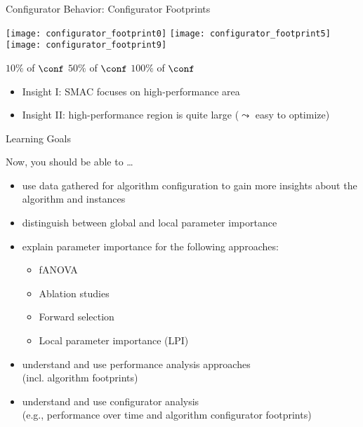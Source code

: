 \begin{frame}[c]{Configurator Behavior: Configurator Footprints}

\centering
\texttt{[image: configurator\_footprint0]}\quad
\texttt{[image: configurator\_footprint5]}\quad
\texttt{[image: configurator\_footprint9]}

$10\%$ of $\conf$ \hspace{2.1cm} $50\%$ of $\conf$ \hspace{2.1cm} $100\%$ of $\conf$

\bigskip
\pause

\begin{itemize}
  \item \alert{Insight I}: SMAC focuses on high-performance area
  \item \alert{Insight II}: high-performance region is quite large ($\leadsto$ easy to optimize)
\end{itemize}

\end{frame}
\begin{frame}[c]{Learning Goals}

Now, you should be able to \ldots

\begin{itemize}
  \item use data gathered for algorithm configuration to gain more insights about the algorithm and instances
  \item distinguish between global and local parameter importance
  \item explain parameter importance for the following approaches:
  \begin{itemize}
    \item fANOVA
    \item Ablation studies
    \item Forward selection
    \item Local parameter importance (LPI)
  \end{itemize}
  \item understand and use performance analysis approaches\\ (incl. algorithm footprints)
  \item understand and use configurator analysis\\ (e.g., performance over time and algorithm configurator footprints)
\end{itemize}

\end{frame}

